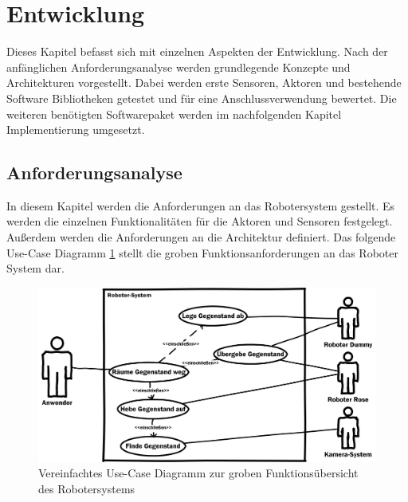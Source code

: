 \section{Entwicklung}
\label{sec:entwicklung}
Dieses Kapitel befasst sich mit einzelnen Aspekten der Entwicklung. Nach der anfänglichen Anforderungsanalyse werden grundlegende Konzepte und Architekturen vorgestellt. Dabei werden erste Sensoren, Aktoren und bestehende Software Bibliotheken getestet und für eine Anschlussverwendung bewertet. Die weiteren benötigten Softwarepaket werden im nachfolgenden Kapitel Implementierung umgesetzt.


\subsection{Anforderungsanalyse}
In diesem Kapitel werden die Anforderungen an das Robotersystem gestellt. Es werden die einzelnen Funktionalitäten für die Aktoren und Sensoren festgelegt. Außerdem werden die Anforderungen an die Architektur definiert. Das folgende Use-Case Diagramm \ref{fig:dev-usecase} stellt die groben Funktionsanforderungen an das Roboter System dar.

 \begin{figure}[H]
 	\centering
 	\includegraphics[scale=0.8]{fig/UseCase}   
 	\caption[Use-Case Robotersystem]{Vereinfachtes Use-Case Diagramm zur groben Funktionsübersicht des Robotersystems}
 	\label{fig:dev-usecase}
 \end{figure}
 
